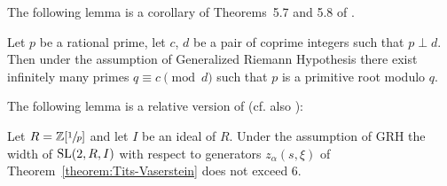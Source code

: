 The following lemma is a corollary of Theorems~5.7 and 5.8 of \cite{LenMorStePrimitiveRoot}.
\begin{lemma}
Let $p$ be a rational prime, let $c$, $d$ be a pair of coprime integers such that $p \perp d$.
Then under the assumption of Generalized Riemann Hypothesis there exist infinitely many primes $q\equiv c\pmod{d}$ such that $p$ is a primitive root modulo $q$.
\end{lemma}

The following lemma is a relative version of \cite[Lemma~6]{VavSmSuUnitrEng} (cf. also \cite{VseUnitrZ1p}):

\begin{lemma}\label{lemma:Z1p}
Let $R=\mathbb{Z}[\sfrac{1}{p}]$ and let $I$ be an ideal of $R$.
Under the assumption of GRH the width of $\operatorname{SL}(2,R,I)$ with respect to generators $z_\alpha(s, \xi)$ of Theorem~\ref{theorem:Tits-Vaserstein} does not exceed $6$.
\end{lemma}

